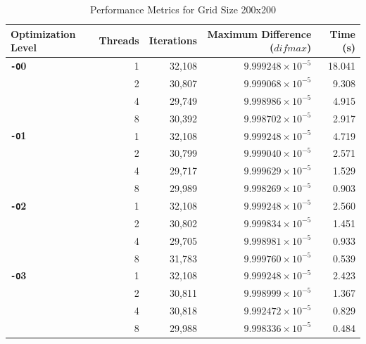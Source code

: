 \documentclass{article}
\begin{document}
\begin{table}[H]
    \centering
    \caption{Performance Metrics for Grid Size 200x200}
    \label{tab:performance_200}
    \begin{tabular}{l r r r r}
    \toprule
    \textbf{Optimization Level} & \textbf{Threads} & \textbf{Iterations} & \textbf{Maximum Difference ($difmax$)} & \textbf{Time (s)} \\
    \midrule
    \textbf{\texttt{-O}0} & 1 & 32,108 & $9.999248 \times 10^{-5}$ & 18.041 \\
        & 2 & 30,807 & $9.999068 \times 10^{-5}$ & 9.308 \\
        & 4 & 29,749 & $9.998986 \times 10^{-5}$ & 4.915 \\
        & 8 & 30,392 & $9.998702 \times 10^{-5}$ & 2.917 \\
    \midrule
    \textbf{\texttt{-O}1} & 1 & 32,108 & $9.999248 \times 10^{-5}$ & 4.719 \\
        & 2 & 30,799 & $9.999040 \times 10^{-5}$ & 2.571 \\
        & 4 & 29,717 & $9.999629 \times 10^{-5}$ & 1.529 \\
        & 8 & 29,989 & $9.998269 \times 10^{-5}$ & 0.903 \\
    \midrule
    \textbf{\texttt{-O}2} & 1 & 32,108 & $9.999248 \times 10^{-5}$ & 2.560 \\
        & 2 & 30,802 & $9.999834 \times 10^{-5}$ & 1.451 \\
        & 4 & 29,705 & $9.998981 \times 10^{-5}$ & 0.933 \\
        & 8 & 31,783 & $9.999760 \times 10^{-5}$ & 0.539 \\
    \midrule
    \textbf{\texttt{-O}3} & 1 & 32,108 & $9.999248 \times 10^{-5}$ & 2.423 \\
        & 2 & 30,811 & $9.998999 \times 10^{-5}$ & 1.367 \\
        & 4 & 30,818 & $9.992472 \times 10^{-5}$ & 0.829 \\
        & 8 & 29,988 & $9.998336 \times 10^{-5}$ & 0.484 \\
    \bottomrule
    \end{tabular}
\end{table}
\end{document}

